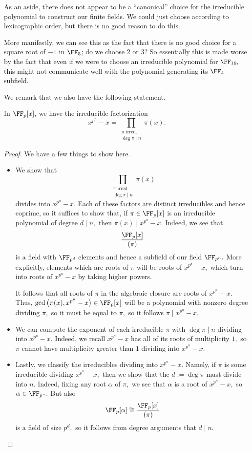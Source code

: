 As an aside, there does not appear to be a ``canonical'' choice for the irreducible polynomial to construct our finite fields. We could just choose according to lexicographic order, but there is no good reason to do this.

More manifestly, we can see this as the fact that there is no good choice for a square root of $-1$ in $\FF_5$; do we choose $2$ or $3$? So essentially this is made worse by the fact that even if we were to choose an irreducible polynomial for $\FF_{16},$ this might not communicate well with the polynomial generating its $\FF_4$ subfield.

We remark that we also have the following statement.
\begin{proposition} \label{prop:factorsplitter}
	In $\FF_p[x],$ we have the irreducible factorization
	\[x^{p^n}-x=\prod_{\substack{\pi\text{ irred.}\\\deg\pi\mid n}}\pi(x).\]
\end{proposition}
\begin{proof}
	We have a few things to show here.
	\begin{itemize}
		\item We show that
		\[\prod_{\substack{\pi\text{ irred.}\\\deg\pi\mid n}}\pi(x)\]
		divides into $x^{p^n}-x.$ Each of these factors are distinct irreducibles and hence coprime, so it suffices to show that, if $\pi\in\FF_p[x]$ is an irreducible polynomial of degree $d\mid n,$ then $\pi(x)\mid x^{p^n}-x.$ Indeed, we see that
		\[\frac{\FF_p[x]}{(\pi)}\]
		is a field with $\FF_{p^d}$ elements and hence a subfield of our field $\FF_{p^n}.$ More explicitly, elements which are roots of $\pi$ will be roots of $x^{p^d}-x,$ which turn into roots of $x^{p^n}-x$ by taking higher powers.

		It follows that all roots of $\pi$ in the algebraic closure are roots of $x^{p^n}-x.$ Thus, $\gcd\left(\pi(x),x^{p^n}-x\right)\in\FF_p[x]$ will be a polynomial with nonzero degree dividing $\pi,$ so it must be equal to $\pi,$ so it follows $\pi\mid x^{p^n}-x.$
		
		\item We can compute the exponent of each irreducible $\pi$ with $\deg\pi\mid n$ dividing into $x^{p^n}-x.$ Indeed, we recall $x^{p^n}-x$ has all of its roots of multiplicity $1,$ so $\pi$ cannot have multiplicity greater than $1$ dividing into $x^{p^n}-x.$

		\item Lastly, we classify the irreducibles dividing into $x^{p^n}-x.$ Namely, if $\pi$ is some irreducible dividing $x^{p^n}-x,$ then we show that the $d:=\deg\pi$ must divide into $n.$ Indeed, fixing any root $\alpha$ of $\pi,$ we see that $\alpha$ is a root of $x^{p^n}-x,$ so $\alpha\in\FF_{p^n}.$ But also
		\[\FF_p[\alpha]\cong\frac{\FF_p[x]}{(\pi)}\]
		is a field of size $p^d,$ so it follows from degree arguments that $d\mid n.$
		\qedhere
	\end{itemize}
\end{proof}
